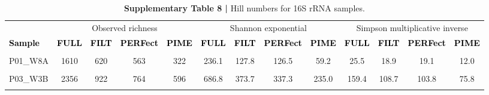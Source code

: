 \documentclass[
  10pt,
  letterpaper,
  DIV=11,
  numbers=noendperiod]{scrartcl}
\begin{document}
\begin{table}[H]

\caption{\textbf{Supplementary Table 8 |} Hill numbers for 16S rRNA samples.}
\centering
\fontsize{7}{9}\selectfont
\begin{threeparttable}
\begin{tabular}[t]{lcccccccccccc}
\toprule
\multicolumn{1}{c}{ } & \multicolumn{4}{c}{Observed richness} & \multicolumn{4}{c}{Shannon exponential} & \multicolumn{4}{c}{Simpson multiplicative inverse} \\
\cmidrule(l{3pt}r{3pt}){2-5} \cmidrule(l{3pt}r{3pt}){6-9} \cmidrule(l{3pt}r{3pt}){10-13}
\textcolor{black}{\textbf{Sample}} & \textcolor{black}{\textbf{FULL}} & \textcolor{black}{\textbf{FILT}} & \textcolor{black}{\textbf{PERFect}} & \textcolor{black}{\textbf{PIME}} & \textcolor{black}{\textbf{FULL}} & \textcolor{black}{\textbf{FILT}} & \textcolor{black}{\textbf{PERFect}} & \textcolor{black}{\textbf{PIME}} & \textcolor{black}{\textbf{FULL}} & \textcolor{black}{\textbf{FILT}} & \textcolor{black}{\textbf{PERFect}} & \textcolor{black}{\textbf{PIME}}\\
\midrule
\cellcolor{gray!6}{P01\_W3A} & \cellcolor{gray!6}{2371} & \cellcolor{gray!6}{831} & \cellcolor{gray!6}{707} & \cellcolor{gray!6}{502} & \cellcolor{gray!6}{760.7} & \cellcolor{gray!6}{385.1} & \cellcolor{gray!6}{353.4} & \cellcolor{gray!6}{226.3} & \cellcolor{gray!6}{200.3} & \cellcolor{gray!6}{128.0} & \cellcolor{gray!6}{123.6} & \cellcolor{gray!6}{84.2}\\
P01\_W8A & 1610 & 620 & 563 & 322 & 236.1 & 127.8 & 126.5 & 59.2 & 25.5 & 18.9 & 19.1 & 12.0\\
\cellcolor{gray!6}{P02\_C0A} & \cellcolor{gray!6}{2272} & \cellcolor{gray!6}{884} & \cellcolor{gray!6}{737} & \cellcolor{gray!6}{590} & \cellcolor{gray!6}{781.1} & \cellcolor{gray!6}{437.1} & \cellcolor{gray!6}{397.4} & \cellcolor{gray!6}{291.2} & \cellcolor{gray!6}{261.5} & \cellcolor{gray!6}{178.5} & \cellcolor{gray!6}{171.6} & \cellcolor{gray!6}{129.3}\\
\addlinespace
P03\_W3B & 2356 & 922 & 764 & 596 & 686.8 & 373.7 & 337.3 & 235.0 & 159.4 & 108.7 & 103.8 & 75.8\\
\cellcolor{gray!6}{P03\_W8B} & \cellcolor{gray!6}{1575} & \cellcolor{gray!6}{422} & \cellcolor{gray!6}{411} & \cellcolor{gray!6}{224} & \cellcolor{gray!6}{501.0} & \cellcolor{gray!6}{181.0} & \cellcolor{gray!6}{211.9} & \cellcolor{gray!6}{90.1} & \cellcolor{gray!6}{153.3} & \cellcolor{gray!6}{69.2} & \cellcolor{gray!6}{82.6} & \cellcolor{gray!6}{38.6}\\

\end{tabular}
\end{threeparttable}
\end{table}
\end{document}
